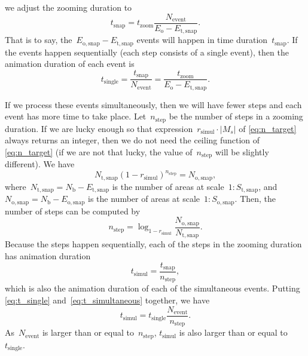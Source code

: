 \documentclass[twocolumn]{svjour3}          %
\begin{document}
we adjust the zooming duration to
\begin{equation*}
\label{eq:E_i}
t_\mathrm{snap}= t_\mathrm{zoom} 
\frac{N_\mathrm{event}}
{E_\mathrm{o} - E_\mathrm{t,snap}}.
\end{equation*}
That is to say, the~$E_\mathrm{o,snap} - E_\mathrm{t,snap}$ events will happen 
in time duration~$t_\mathrm{snap}$.
If the events happen sequentially (each step consists of a single event), 
then the animation duration of each event is
\begin{equation}
\label{eq:t_single}
t_\mathrm{single}   = \frac{t_\mathrm{snap}}{N_\mathrm{event}} 
                    = \frac{t_\mathrm{zoom}}{E_\mathrm{o} - E_\mathrm{t,snap}}.
\end{equation}

If we process these events simultaneously, 
then we will have fewer steps and 
each event has more time to take place.
Let~$n_\mathrm{step}$ be the number of steps in a zooming duration.
If we are lucky enough so that
expression~$r_\mathrm{simul} \cdot |M_s|$ of \eq\ref{eq:n_target}
always returns an integer, 
then we do not need the ceiling function of \eq\ref{eq:n_target}
(if we are not that lucky, the value of~$n_\mathrm{step}$ will be slightly different).
We have 
\begin{equation*}
N_\mathrm{t,snap} (1-r_\mathrm{simul})^{n_\mathrm{step}} = N_\mathrm{o,snap},
\end{equation*}
where~$N_\mathrm{t,snap} = N_\mathrm{b}- E_\mathrm{t,snap}$ 
is the number of areas at scale~$1:S_\mathrm{t,snap}$,
and~$N_\mathrm{o,snap} = N_\mathrm{b}- E_\mathrm{o,snap}$
is the number of areas at scale~$1:S_\mathrm{o,snap}$.
Then, the number of steps can be computed by
\begin{equation*}
n_\mathrm{step} = \log_{1-r_\mathrm{simul}} 
    \frac{N_\mathrm{o,snap}}{N_\mathrm{t,snap}}.
\end{equation*}
Because the steps happen sequentially,
each of the steps in the zooming duration has
animation duration
\begin{equation}
\label{eq:t_simultaneous}
t_\mathrm{simul} = \frac{t_\mathrm{snap}}{n_\mathrm{step}},
\end{equation}
which is also the animation duration of each of the simultaneous events.
Putting \eqs\ref{eq:t_single} and~\ref{eq:t_simultaneous} together,
we have
\begin{equation*}
\label{eq:t_compare_appx}
t_\mathrm{simul} = t_\mathrm{single}  \frac{N_\mathrm{event}}{n_\mathrm{step}}.
\end{equation*}
As~$N_\mathrm{event}$ is larger than or equal to~$n_\mathrm{step}$,
$t_\mathrm{simul}$ is also larger than or equal to~$t_\mathrm{single}$.
\end{document}
